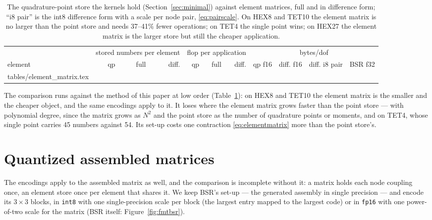 \documentclass[sigconf,balance=false]{acmart}
\makeatletter
\newcommand{\rows}[1]{\@@input #1 }
\makeatother
\begin{document}
\begin{table}[t]
\centering
\footnotesize
\setlength{\tabcolsep}{4pt}
\begin{tabular}{lrrrrrrrrrr}
\toprule
 & \multicolumn{3}{c}{stored numbers per element} & \multicolumn{3}{c}{flop per application} &
   \multicolumn{4}{c}{bytes/dof} \\
\cmidrule(lr){2-4}\cmidrule(lr){5-7}\cmidrule(lr){8-11}
element & qp & full & diff. & qp & full & diff. & qp f16 & diff. f16 & diff. i8 pair & BSR f32 \\
\midrule
\rows{tables/element_matrix.tex}
\bottomrule
\end{tabular}
\caption{The quadrature-point store the kernels hold (Section~\ref{sec:minimal}) against element matrices, full
and in difference form; ``i8 pair'' is the int8 difference form with a scale per node pair,
\eqref{eq:pairscale}.  On HEX8 and TET10 the element matrix is no larger than the point store and
needs 37--41\% fewer operations; on TET4 the single point wins; on HEX27 the element matrix is the
larger store but still the cheaper application.}
\label{tab:elementmatrix}
\end{table}

The comparison runs against the method of this paper at low order (Table~\ref{tab:elementmatrix}):
on HEX8 and TET10 the element matrix is the smaller and the cheaper object, and the same encodings
apply to it.  It loses where the element matrix grows faster than the point store --- with
polynomial degree, since the matrix grows as $N^2$ and the point store as the number of
quadrature points or moments, and on TET4, whose single point carries 45 numbers against 54.  Its
set-up costs one contraction \eqref{eq:elementmatrix} more than the point store's.

\section{Quantized assembled matrices}
\label{sec:qbsr}

The encodings apply to the assembled matrix as well, and the comparison is incomplete without it: a
matrix holds each node coupling once, an element store once per element that shares it.  We keep
BSR's set-up --- the generated assembly in single precision --- and encode its $3\times3$ blocks, in
\texttt{int8} with one single-precision scale per block (the largest entry mapped to the largest
code) or in \texttt{fp16} with one power-of-two scale for the matrix (BSR itself:
Figure~\ref{fig:fmtbsr}).
\end{document}
